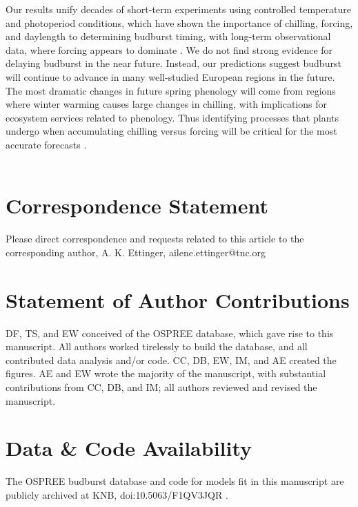 \documentclass{article}
\begin{document}
 \par Our results unify decades of short-term experiments using controlled temperature and photoperiod conditions, which have shown the importance of chilling, forcing, and daylength to determining budburst timing, with long-term observational data, where forcing appears to dominate \emph{\citep[e.g.,][]{roberts2015}}. We do not find strong evidence for delaying budburst in the near future. Instead, our predictions suggest budburst will continue to advance in many well-studied European regions in the future. The most dramatic changes in future spring phenology will come from regions where winter warming causes large changes in chilling, with implications for ecosystem services related to phenology. Thus identifying processes that plants undergo when accumulating chilling versus forcing will be critical for the most accurate forecasts \emph{\citep{chuine2016,Singh:2017}}. \\
 \\
\section*{Correspondence Statement}
Please direct correspondence and requests related to this article to the corresponding author, A. K. Ettinger, ailene.ettinger@tnc.org\\
\section*{Statement of Author Contributions} 
DF, TS, and EW conceived of the OSPREE database, which gave rise to this manuscript. All authors worked tirelessly to build the database, and all contributed data analysis and/or code. CC, DB, EW, IM, and AE created the figures. AE and EW wrote the majority of the manuscript, with substantial contributions from CC, DB, and IM; all authors reviewed and revised the manuscript. 

\section*{Data \& Code Availability} 
The OSPREE budburst database and code for models fit in this manuscript are publicly archived at KNB, doi:10.5063/F1QV3JQR \citep{wolkovich2019}.
\end{document}
